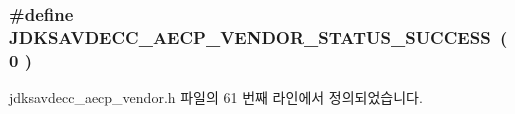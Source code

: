 \subsubsection[{\texorpdfstring{J\+D\+K\+S\+A\+V\+D\+E\+C\+C\+\_\+\+A\+E\+C\+P\+\_\+\+V\+E\+N\+D\+O\+R\+\_\+\+S\+T\+A\+T\+U\+S\+\_\+\+S\+U\+C\+C\+E\+SS}{JDKSAVDECC_AECP_VENDOR_STATUS_SUCCESS}}]{\setlength{\rightskip}{0pt plus 5cm}\#define J\+D\+K\+S\+A\+V\+D\+E\+C\+C\+\_\+\+A\+E\+C\+P\+\_\+\+V\+E\+N\+D\+O\+R\+\_\+\+S\+T\+A\+T\+U\+S\+\_\+\+S\+U\+C\+C\+E\+SS~( 0 )}\hypertarget{group__aecp__vendor__status_gaa4222c1275a2e15ffa8d3e395c77018c}{}\label{group__aecp__vendor__status_gaa4222c1275a2e15ffa8d3e395c77018c}


jdksavdecc\+\_\+aecp\+\_\+vendor.\+h 파일의 61 번째 라인에서 정의되었습니다.

